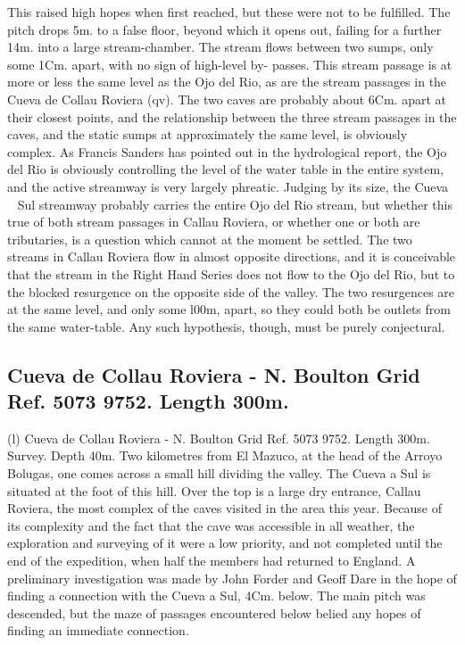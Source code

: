 \documentclass[11pt, a4paper, twoside]{memoir}
\begin{document}
This raised high hopes when first reached, but these were not to be fulfilled. The pitch drops 5m. to a false floor, beyond which it opens out, failing for a further 14m. into a large stream-chamber. The stream flows between two sumps, only some 1Cm. apart, with no sign of high-level by- passes. This stream passage is at more or less the same level as the Ojo del Rio, as are the stream passages in the Cueva de Collau Roviera (qv). The two caves are probably about 6Cm. apart at their closest points, and the relationship between the three stream passages in the caves, and the static sumps at approximately the same level, is obviously complex. As Francis Sanders has pointed out in the hydrological report, the Ojo del Rio is obviously controlling the level of the water table in the entire system, and the active streamway is very largely phreatic. Judging by its size, the Cueva ~ Sul streamway probably carries the entire Ojo del Rio stream, but whether this true of both stream passages in Callau Roviera, or whether one or both are tributaries, is a question which cannot at the moment be settled. The two streams in Callau Roviera flow in almost opposite directions, and it is conceivable that the stream in the Right Hand Series does not flow to the Ojo del Rio, but to the blocked resurgence on the opposite side of the valley. The two resurgences are at the same level, and only some l00m, apart, so they could both be outlets from the same water-table. Any such hypothesis, though, must be purely conjectural.


\subsection*{Cueva de Collau Roviera - N. Boulton Grid Ref. 5073 9752. Length 300m.}




(l) Cueva de Collau Roviera - N. Boulton Grid Ref. 5073 9752. Length 300m.
Survey. Depth 40m. Two kilometres from El Mazuco, at the head of the Arroyo Bolugas, one comes across a small hill dividing the valley. The Cueva a Sul is situated at the foot of this hill. Over the top is a large dry entrance, Callau Roviera, the most complex of the caves visited in the area this year. Because of its complexity and the fact that the cave was accessible in all weather, the exploration and surveying of it were a low priority, and not completed until the end of the expedition, when half the members had returned to England. A preliminary investigation was made by John Forder and Geoff Dare in the hope of finding a connection with the Cueva a Sul, 4Cm. below. The main pitch was descended, but the maze of passages encountered below belied any hopes of finding an immediate connection.
\end{document}
